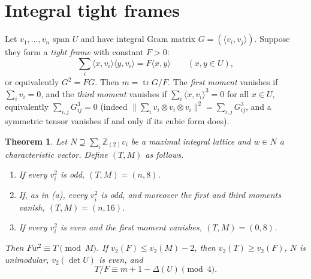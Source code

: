 \documentclass[11pt]{article}
\newtheorem{theorem}{Theorem}[section]
\theoremstyle{definition}
\theoremstyle{remark}
\newcommand{\Z}{\mathbb Z}
\newcommand{\Zt}{\Z_{(2)}}
\newcommand{\ip}[2]{\langle #1,#2\rangle}
\begin{document}
\section{Integral tight frames}\label{sec:frames}

Let $v_1,\dots,v_n$ span $U$ and have integral Gram matrix
$G=(\ip{v_i}{v_j})$. Suppose they form a \emph{tight frame} with constant
$F>0$:
\begin{equation}\label{eq:frame}
 \sum_i\ip x{v_i}\ip y{v_i}=F\ip xy\qquad(x,y\in U),
\end{equation}
or equivalently $G^2=FG$. Then $m=\operatorname{tr}G/F$. The \emph{first
moment} vanishes if $\sum_iv_i=0$, and the \emph{third moment} vanishes if
$\sum_i\ip x{v_i}^3=0$ for all $x\in U$, equivalently
$\sum_{i,j}G_{ij}^3=0$ (indeed $\|\sum_iv_i\otimes v_i\otimes v_i\|^2=
\sum_{i,j}G_{ij}^3$, and a symmetric tensor vanishes if and only if its cubic
form does).

\begin{theorem}\label{thm:frame}
Let $N\supseteq\sum_i\Zt v_i$ be a maximal integral lattice and $w\in N$ a
characteristic vector. Define $(T,M)$ as follows.
\begin{enumerate}[label=\textup{(\alph*)}]
\item If every $v_i^2$ is odd, $(T,M)=(n,8)$.
\item If, as in (a), every $v_i^2$ is odd, and moreover the first and third
moments vanish, $(T,M)=(n,16)$.
\item If every $v_i^2$ is even and the first moment vanishes, $(T,M)=(0,8)$.
\end{enumerate}
Then $Fw^2\equiv T\pmod M$. If $v_2(F)\le v_2(M)-2$, then $v_2(T)\ge v_2(F)$,
$N$ is unimodular, $v_2(\det U)$ is even, and
\[
 T/F\equiv m+1-\Delta(U)\pmod 4 .
\]
\end{theorem}
\end{document}
